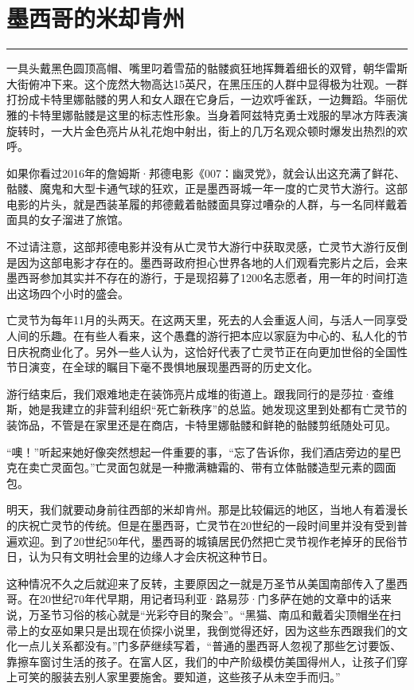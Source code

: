 \documentclass[12pt,oneside]{book}
\newcommand\hr{\par\noindent\hrule}
\begin{document}
\section{墨西哥的米却肯州}
\hr
一具头戴黑色圆顶高帽、嘴里叼着雪茄的骷髅疯狂地挥舞着细长的双臂，朝华雷斯大街俯冲下来。这个庞然大物高达15英尺，在黑压压的人群中显得极为壮观。一群打扮成卡特里娜骷髅的男人和女人跟在它身后，一边欢呼雀跃，一边舞蹈。华丽优雅的卡特里娜骷髅是这里的标志性形象。当身着阿兹特克勇士戏服的旱冰方阵表演旋转时，一大片金色亮片从礼花炮中射出，街上的几万名观众顿时爆发出热烈的欢呼。

如果你看过2016年的詹姆斯·邦德电影《007：幽灵党》，就会认出这充满了鲜花、骷髅、魔鬼和大型卡通气球的狂欢，正是墨西哥城一年一度的亡灵节大游行。这部电影的片头，就是西装革履的邦德戴着骷髅面具穿过嘈杂的人群，与一名同样戴着面具的女子溜进了旅馆。

不过请注意，这部邦德电影并没有从亡灵节大游行中获取灵感，亡灵节大游行反倒是因为这部电影才存在的。墨西哥政府担心世界各地的人们观看完影片之后，会来墨西哥参加其实并不存在的游行，于是现招募了1200名志愿者，用一年的时间打造出这场四个小时的盛会。

亡灵节为每年11月的头两天。在这两天里，死去的人会重返人间，与活人一同享受人间的乐趣。在有些人看来，这个愚蠢的游行把本应以家庭为中心的、私人化的节日庆祝商业化了。另外一些人认为，这恰好代表了亡灵节正在向更加世俗的全国性节日演变，在全球的瞩目下毫不畏惧地展现墨西哥的历史文化。

游行结束后，我们艰难地走在装饰亮片成堆的街道上。跟我同行的是莎拉·查维斯，她是我建立的非营利组织“死亡新秩序”的总监。她发现这里到处都有亡灵节的装饰品，不管是在家里还是在商店，卡特里娜骷髅和鲜艳的骷髅剪纸随处可见。

“噢！”听起来她好像突然想起一件重要的事，“忘了告诉你，我们酒店旁边的星巴克在卖亡灵面包。”亡灵面包就是一种撒满糖霜的、带有立体骷髅造型元素的圆面包。

明天，我们就要动身前往西部的米却肯州。那是比较偏远的地区，当地人有着漫长的庆祝亡灵节的传统。但是在墨西哥，亡灵节在20世纪的一段时间里并没有受到普遍欢迎。到了20世纪50年代，墨西哥的城镇居民仍然把亡灵节视作老掉牙的民俗节日，认为只有文明社会里的边缘人才会庆祝这种节日。

这种情况不久之后就迎来了反转，主要原因之一就是万圣节从美国南部传入了墨西哥。在20世纪70年代早期，用记者玛利亚·路易莎·门多萨在她的文章中的话来说，万圣节习俗的核心就是“光彩夺目的聚会”。“黑猫、南瓜和戴着尖顶帽坐在扫帚上的女巫如果只是出现在侦探小说里，我倒觉得还好，因为这些东西跟我们的文化一点儿关系都没有。”门多萨继续写着，“普通的墨西哥人忽视了那些乞讨要饭、靠擦车窗讨生活的孩子。在富人区，我们的中产阶级模仿美国得州人，让孩子们穿上可笑的服装去别人家里要施舍。要知道，这些孩子从未空手而归。”
\end{document}
